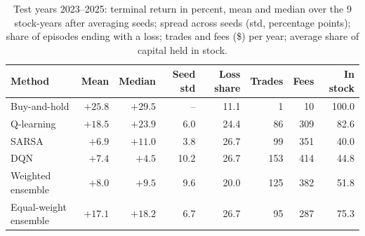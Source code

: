 \begin{table}[t]
\centering
\caption{Test years 2023--2025: terminal return in percent, mean and median over the 9 stock-years after averaging seeds; spread across seeds (std, percentage points); share of episodes ending with a loss; trades and fees (\$) per year; average share of capital held in stock.}
\label{tab:main}
\small
\begin{tabular}{lrrrrrrr}
\toprule
Method & Mean & Median & Seed std & Loss share & Trades & Fees & In stock \\
\midrule
Buy-and-hold & $+25.8$ & $+29.5$ & -- & 11.1 & 1 & 10 & 100.0 \\
Q-learning & $+18.5$ & $+23.9$ & 6.0 & 24.4 & 86 & 309 & 82.6 \\
SARSA & $+6.9$ & $+11.0$ & 3.8 & 26.7 & 99 & 351 & 40.0 \\
DQN & $+7.4$ & $+4.5$ & 10.2 & 26.7 & 153 & 414 & 44.8 \\
Weighted ensemble & $+8.0$ & $+9.5$ & 9.6 & 20.0 & 125 & 382 & 51.8 \\
Equal-weight ensemble & $+17.1$ & $+18.2$ & 6.7 & 26.7 & 95 & 287 & 75.3 \\
\bottomrule
\end{tabular}
\end{table}
